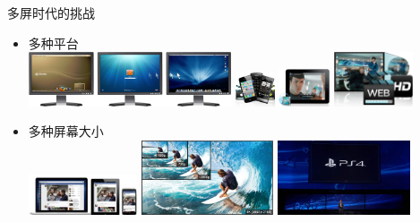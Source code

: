 \documentclass{beamer}
\begin{document}
\begin{frame}{多屏时代的挑战}
\begin{itemize}
\item 多种平台\\ %
\includegraphics[height=1.6cm]{fig/PCs.png}\pause
\includegraphics[height=1.0cm]{fig/mobile-bc.png}\pause
\includegraphics[height=1.1cm]{fig/streaming-bc.png}\pause
\includegraphics[height=1.6cm]{fig/video_quality-bc.png} \pause
\item 多种屏幕大小\\ %
\includegraphics[height=1.2cm]{fig/screen_sizes.jpg}\pause
\includegraphics[height=2.2cm]{fig/480_to_4KVideo.jpg}\pause
\includegraphics[height=2.2cm]{fig/4k_video.jpg} \pause
\end{itemize}
\end{frame}
\end{document}
